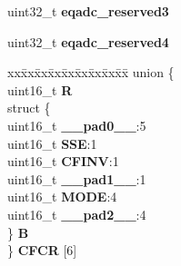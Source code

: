 \begin{DoxyCompactItemize}
\begin{tabbing}
\end{tabbing}\item 
\mbox{\label{structEQADC__tag_a9467b541a3443805cfba1a4e2ec75b75}} 
uint32\+\_\+t {\bfseries eqadc\+\_\+reserved3}
\item 
\mbox{\label{structEQADC__tag_ae6e9d08123ed505c8bdfd2eb00a6e0b0}} 
uint32\+\_\+t {\bfseries eqadc\+\_\+reserved4}
\item 
\mbox{\label{structEQADC__tag_aec01b55000cb0cdbee36609c5f34a1fd}} 
\begin{tabbing}
xx\=xx\=xx\=xx\=xx\=xx\=xx\=xx\=xx\=\kill
union \{\\
\>uint16\_t {\bfseries R}\\
\>struct \{\\
\>\>uint16\_t {\bfseries \_\_pad0\_\_}:5\\
\>\>uint16\_t {\bfseries SSE}:1\\
\>\>uint16\_t {\bfseries CFINV}:1\\
\>\>uint16\_t {\bfseries \_\_pad1\_\_}:1\\
\>\>uint16\_t {\bfseries MODE}:4\\
\>\>uint16\_t {\bfseries \_\_pad2\_\_}:4\\
\>\} {\bfseries B}\\
\} {\bfseries CFCR} \mbox{[}6\mbox{]}\\


\end{tabbing}
\end{DoxyCompactItemize}
